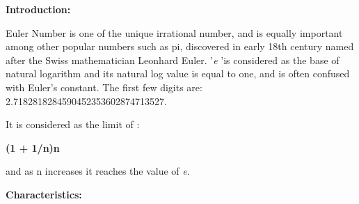 \documentclass[12pt]{report}
\begin{document}
\vspace{\baselineskip}

\vspace{\baselineskip}

\vspace{\baselineskip}

\vspace{\baselineskip}

\vspace{\baselineskip}

\vspace{\baselineskip}

\vspace{\baselineskip}
\begin{justify}
{\fontsize{14pt}{16.8pt}\selectfont \textbf{\textcolor[HTML]{2F5496}{Introduction:}}\par}
\end{justify}\par


\vspace{\baselineskip}
\begin{justify}
Euler Number is one of the unique irrational number, and is equally important among other popular numbers such as pi, discovered in early 18th century named after the Swiss mathematician Leonhard Euler. '\textit{e }'is considered as the base of natural logarithm and its natural log value is equal to one, and is often confused with Euler's constant. The first few digits are: 2.7182818284590452353602874713527.
\end{justify}\par

\begin{justify}
It is considered as the limit of :
\end{justify}\par

\begin{adjustwidth}{2.5in}{0.0in}
\textbf{(1 + 1/n)n}\par

\end{adjustwidth}

\begin{justify}
and as n increases it reaches the value of \textit{e}. 
\end{justify}\par

\begin{justify}
{\fontsize{14pt}{16.8pt}\selectfont \textbf{\textcolor[HTML]{2F5496}{Characteristics:}}\par}
\end{justify}\par
\end{document}
